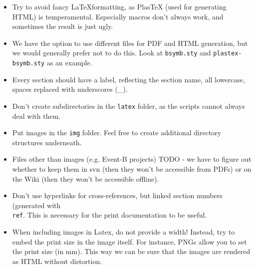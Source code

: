 \begin{itemize}
	\item Try to avoid fancy \LaTeX formatting, as PlasTeX (used for generating HTML) is temperamental.  Especially macros don't always work, and sometimes the result is just ugly.
	\item We have the option to use different files for PDF and HTML generation, but we would generally prefer not to do this.  Look at \texttt{bsymb.sty} and \texttt{plastex-bsymb.sty} as an example.
	\item Every section should have a label, reflecting the section name, all lowercase, spaces replaced with underscores (\_).
	\item Don't create subdirectories in the \texttt{latex} folder, as the scripts cannot always deal with them.
	\item Put images in the \texttt{img} folder.  Feel free to create additional directory structures underneath.
	\item Files other than images (e.g. Event-B projects) TODO - we have to figure out whether to keep them in svn (then they won't be accessible from PDFs) or on the Wiki (then they won't be accessible offline).
	\item Don't use hyperlinks for cross-references, but linked section numbers (generated with \texttt{\\ref{}}.  This is necessary for the print documentation to be useful.
	\item When including images in Latex, do not provide a width!  Instead, try to embed the print size in the image itself.  For instance, PNGs allow you to set the print size (in mm).  This way we can be sure that the images are rendered as HTML without distortion.
\end{itemize}

